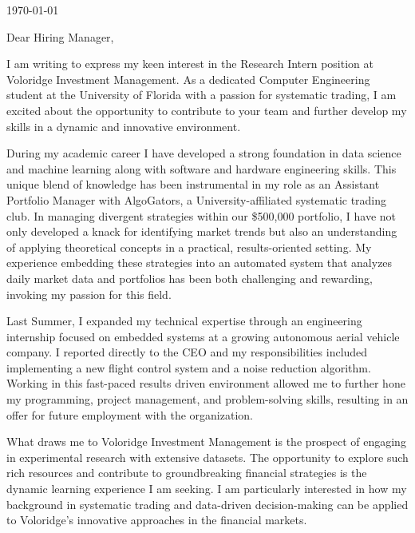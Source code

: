 \documentclass{ExpressiveCoverLetter}
\begin{document}
\sloppy

\coverletterheader[
    firstname=Cole,
    middleinitial=H,
    lastname=Rottenberg,
    email=cole.rottenberg@gmail.com,
    phone=407-961-0600,
    linkedin=cole-rottenberg,
    github=colerottenberg,
    city=Orlando,
    state=Florida,
]

\today

Dear Hiring Manager,

I am writing to express my keen interest in the Research Intern position
at Voloridge Investment Management.
As a dedicated Computer Engineering student at the University of Florida
with a passion for systematic trading, I am excited about the
opportunity to contribute to your team and further develop my skills in
a dynamic and innovative environment.

During my academic career I have developed a strong foundation in data
science and machine learning along with software and hardware
engineering skills. This unique blend of knowledge has been instrumental
in my role as an Assistant Portfolio Manager with AlgoGators, a
University-affiliated systematic trading club. In managing divergent
strategies within our \$500,000 portfolio, I have not only developed a
knack for identifying market trends but also an understanding of
applying theoretical concepts in a practical, results-oriented setting.
My experience embedding these strategies into an automated system that
analyzes daily market data and portfolios has been both challenging and
rewarding, invoking my passion for this field.

Last Summer, I expanded my technical expertise through an engineering
internship focused on embedded systems at a growing autonomous aerial
vehicle company. I reported directly to the CEO and my responsibilities
included implementing a new flight control system and a noise reduction
algorithm. Working in this fast-paced results driven environment allowed
me to further hone my programming, project management, and
problem-solving skills, resulting in an offer for future employment with
the organization.

What draws me to Voloridge Investment Management is the prospect of
engaging in experimental research with extensive datasets. The
opportunity to explore such rich resources and contribute to
groundbreaking financial strategies is the dynamic learning experience I
am seeking. I am particularly interested in how my background in
systematic trading and data-driven decision-making can be applied to
Voloridge’s innovative approaches in the financial markets.
\end{document}
